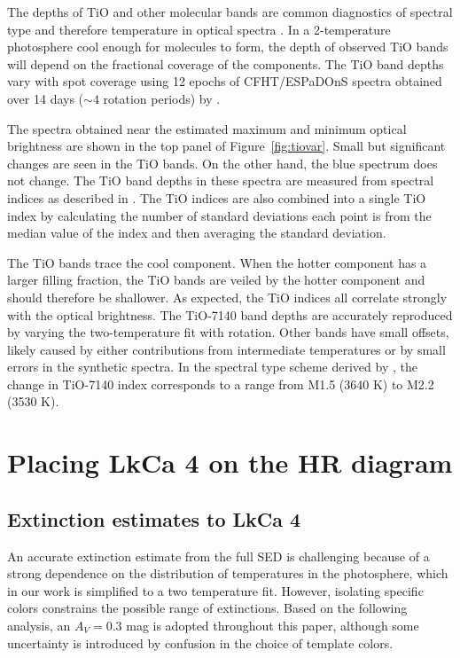 \documentclass[twocolumn]{emulateapj}%
\begin{document}
The depths of TiO and other molecular bands are common diagnostics of spectral type and therefore temperature in optical spectra \citep[e.g.][]{kirkpatrick91}.  In a 2-temperature photosphere cool enough for molecules to form, the depth of observed TiO bands will depend on the fractional coverage of the components.  The TiO band depths vary with spot coverage using 12 epochs of CFHT/ESPaDOnS spectra obtained over 14 days ($\sim 4$ rotation periods) by \citet{donati14}.

The spectra obtained near the estimated maximum and minimum optical brightness are shown in the top panel of Figure~\ref{fig:tiovar}.  Small but significant changes are seen in the TiO bands.  On the other hand, the blue spectrum does not change.  The TiO band depths in these spectra are measured from spectral indices as described in \citet{herczeg14}.  The TiO indices are also combined into a single TiO index by calculating the number of standard deviations each point is from the median value of the index and then averaging the standard deviation.  

The TiO bands trace the cool component.  When the hotter component has a larger filling fraction, the TiO bands are veiled by the hotter component and should therefore be shallower. As expected, 
the TiO indices all correlate strongly with the optical brightness.  The TiO-7140 band depths are accurately reproduced by varying the two-temperature fit with rotation.  Other bands have small offsets, likely caused by either contributions from intermediate temperatures or by small errors in the synthetic spectra.  In the spectral type scheme derived by \citet{herczeg14}, the change in TiO-7140 index corresponds to a range from M1.5 (3640 K) to M2.2 (3530 K). 


\section{Placing LkCa 4 on the HR diagram}


\subsection{Extinction estimates to LkCa 4}

An accurate extinction estimate from the full SED is challenging because of a strong dependence on the  distribution of temperatures in the photosphere, which in our work is simplified to a two temperature fit.  However, isolating specific colors constrains the possible range of extinctions.  Based on the following analysis, an $A_V=0.3$ mag is adopted throughout this paper, although some uncertainty is introduced by confusion in the choice of template colors.
\end{document}
